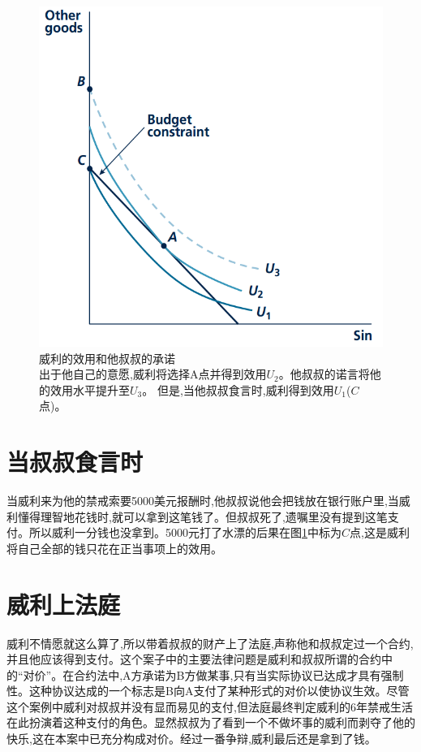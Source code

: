 \documentclass[10pt, a4paper]{ctexart} %
\begin{document}
\begin{figure}[ht]
	\centering
	\includegraphics[scale=0.4]{fig//uncle.png} %
	\caption{威利的效用和他叔叔的承诺\\出于他自己的意愿,威利将选择A点并得到效用$U_2$。他叔叔的诺言将他的效用水平提升至$U_3$。
		但是,当他叔叔食言时,威利得到效用$U_1$($C$点)。} %
	\label{uncle} %
\end{figure}

\section*{当叔叔食言时}
当威利来为他的禁戒索要5000美元报酬时,他叔叔说他会把钱放在银行账户里,当威利懂得理智地花钱时,就可以拿到这笔钱了。但叔叔死了,遗嘱里没有提到这笔支付。所以威利一分钱也没拿到。5000元打了水漂的后果在图\ref{uncle}中标为$C$点,这是威利将自己全部的钱只花在正当事项上的效用。

\section*{威利上法庭}
威利不情愿就这么算了,所以带着叔叔的财产上了法庭,声称他和叔叔定过一个合约,并且他应该得到支付。这个案子中的主要法律问题是威利和叔叔所谓的合约中的“对价”。在合约法中,A方承诺为B方做某事,只有当实际协议已达成才具有强制性。这种协议达成的一个标志是B向A支付了某种形式的对价以使协议生效。尽管这个案例中威利对叔叔并没有显而易见的支付,但法庭最终判定威利的6年禁戒生活在此扮演着这种支付的角色。显然叔叔为了看到一个不做坏事的威利而剥夺了他的快乐,这在本案中已充分构成对价。经过一番争辩,威利最后还是拿到了钱。
\end{document}
